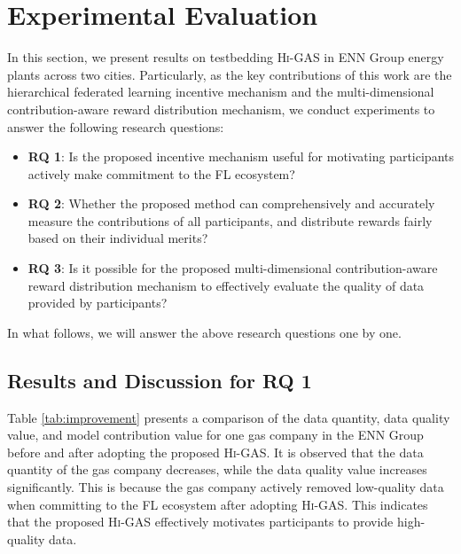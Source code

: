 \documentclass{article}
\newcommand{\methodname}{\textsc{Hi-GAS}}
\newcommand{\note}[1]{\textbf{\color{red}[***** #1 *****]}}
\begin{document}
\section{Experimental Evaluation}

In this section, we present results on testbedding \methodname{} in ENN Group energy plants across two cities.
Particularly, as the key contributions of this work are the hierarchical federated learning incentive mechanism and the multi-dimensional contribution-aware reward distribution mechanism, we conduct experiments to answer the following research questions:
\begin{itemize}
    \item \textbf{RQ 1}: Is the proposed incentive mechanism useful for motivating participants actively make commitment to the FL ecosystem?
    \item \textbf{RQ 2}: Whether the proposed method can comprehensively and accurately measure the contributions of all participants, and distribute rewards fairly based on their individual merits?
    \item \textbf{RQ 3}: Is it possible for the proposed multi-dimensional contribution-aware reward distribution mechanism to effectively evaluate the quality of data provided by participants?
\end{itemize}

In what follows, we will answer the above research questions one by one.


\subsection{Results and Discussion for RQ 1}
Table \ref{tab:improvement} presents a comparison of the data quantity, data quality value, and model contribution value for one gas company in the ENN Group before and after adopting the proposed \methodname{}. It is observed that the data quantity of the gas company decreases, while the data quality value increases significantly. This is because the gas company actively removed low-quality data when committing to the FL ecosystem after adopting \methodname{}. This indicates that the proposed \methodname{} effectively motivates participants to provide high-quality data.
\end{document}
